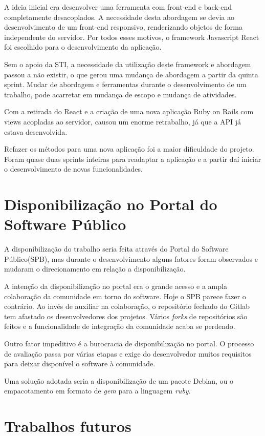 A ideia inicial era desenvolver uma ferramenta com front-end e back-end completamente desacoplados. A necessidade desta abordagem se devia ao desenvolvimento de um front-end responsivo, renderizando objetos de forma independente do servidor. Por todos esses motivos, o framework Javascript React foi escolhido para o desenvolvimento da aplicação.

Sem o apoio da STI, a necessidade da utilização deste framework e abordagem passou a não existir, o que gerou uma mudança de abordagem a partir da quinta sprint. Mudar de abordagem e ferramentas durante o desenvolvimento de um trabalho, pode acarretar em mudança de escopo e mudança de atividades.

Com a retirada do React e a criação de uma nova aplicação Ruby on Rails com views acopladas ao servidor, causou um enorme retrabalho, já que a API já estava desenvolvida.

Refazer os métodos para uma nova aplicação foi a maior dificuldade do projeto. Foram quase duas sprints inteiras para readaptar a aplicação e a partir daí iniciar o desenvolvimento de novas funcionalidades.

\section{Disponibilização no Portal do Software Público}

A disponibilização do trabalho seria feita através do Portal do Software Público(SPB), mas durante o desenvolvimento alguns fatores foram observados e mudaram o direcionamento em relação a disponibilização.

A intenção da disponibilização no portal era o grande acesso e a ampla colaboração da comunidade em torno do software. Hoje o SPB parece fazer o contrário. Ao invés de auxiliar na colaboração, o repositório fechado do Gitlab tem afastado os desenvolvedores dos projetos. Vários \textit{forks} de repositórios são feitos e a funcionalidade de integração da comunidade acaba se perdendo.

Outro fator impeditivo é a burocracia de disponibilização no portal. O processo de avaliação passa por várias etapas e exige do desenvolvedor muitos requisitos para deixar disponível o software à comunidade.

Uma solução adotada seria a disponibilização de um pacote Debian, ou o empacotamento em formato de \textit{gem} para a linguagem \textit{ruby}.

\section{Trabalhos futuros}
